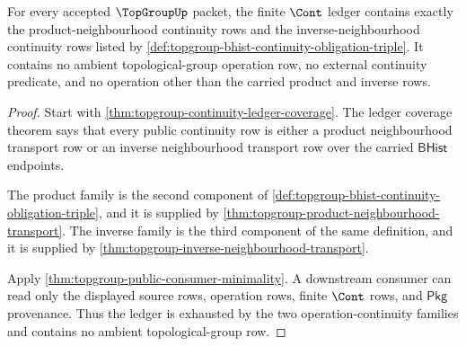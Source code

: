 \begin{theorem}
\label{thm:topgroup-cont-ledger-operation-exhaustion}
For every accepted $\TopGroupUp$ packet, the finite $\Cont$ ledger contains
exactly the product-neighbourhood continuity rows and the inverse-neighbourhood
continuity rows listed by
\autoref{def:topgroup-bhist-continuity-obligation-triple}. It contains no
ambient topological-group operation row, no external continuity predicate, and
no operation other than the carried product and inverse rows.
\end{theorem}
\begin{proof}
Start with \autoref{thm:topgroup-continuity-ledger-coverage}. The ledger
coverage theorem says that every public continuity row is either a product
neighbourhood transport row or an inverse neighbourhood transport row over the
carried $\mathsf{BHist}$ endpoints.

The product family is the second component of
\autoref{def:topgroup-bhist-continuity-obligation-triple}, and it is supplied
by \autoref{thm:topgroup-product-neighbourhood-transport}. The inverse family
is the third component of the same definition, and it is supplied by
\autoref{thm:topgroup-inverse-neighbourhood-transport}.

Apply \autoref{thm:topgroup-public-consumer-minimality}. A downstream consumer
can read only the displayed source rows, operation rows, finite $\Cont$ rows,
and $\mathsf{Pkg}$ provenance. Thus the ledger is exhausted by the two
operation-continuity families and contains no ambient topological-group row.
\end{proof}

